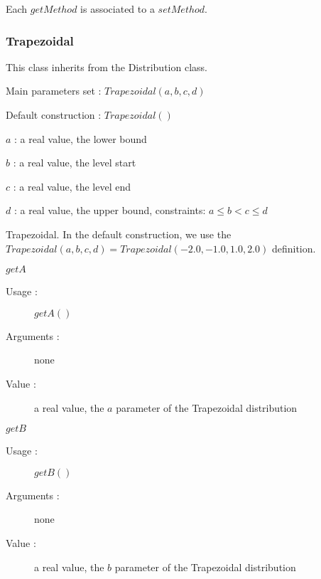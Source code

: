 Each  $getMethod$  is associated to a $setMethod$.

\newpage \subsubsection{Trapezoidal}

This class inherits from the Distribution class.

\begin{description}

\item[Usage :] \rule{0pt}{1em}
  \begin{description}
  \item Main parameters set : $Trapezoidal(a,b,c,d)$
  \item Default construction : $Trapezoidal( )$
  \end{description}

\item[Arguments :]  \rule{0pt}{1em}
  \begin{description}
  \item $a$ : a real value, the lower bound
  \item $b$ : a real value, the level start
  \item $c$ : a real value, the level end
  \item $d$ : a real value, the upper bound, constraints: $a\leq b < c\leq d$
  \end{description}

\item[Value :]  Trapezoidal. In the default construction, we use the $Trapezoidal(a,b,c,d) = Trapezoidal(-2.0,-1.0,1.0, 2.0)$ definition.

\item[Some methods :] \rule{0pt}{1em}
  \begin{description}

  \item $getA$
    \begin{description}
    \item[Usage :] $getA()$
    \item[Arguments :] none
    \item[Value :]  a real value,  the $a$ parameter of the Trapezoidal distribution
    \end{description}
    \bigskip

  \item $getB$
    \begin{description}
    \item[Usage :] $getB()$
    \item[Arguments :] none
    \item[Value :]  a real value,  the $b$ parameter of the Trapezoidal distribution
    \end{description}


\end{description}
\end{description}
